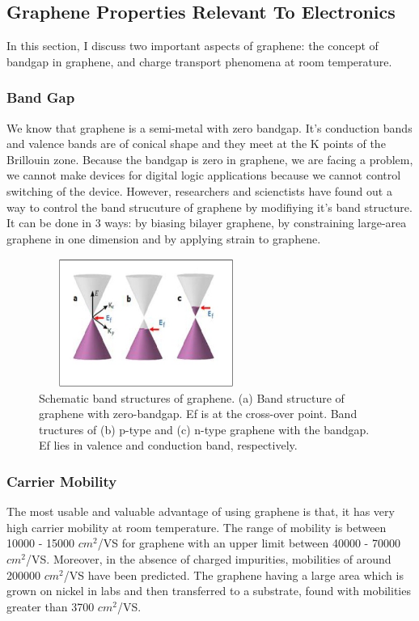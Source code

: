\documentclass[conference]{IEEEtran}
\begin{document}
\subsection{\textbf{Graphene Properties Relevant To Electronics}}
In this section, I discuss two important aspects of graphene: the concept of bandgap in graphene, and charge transport phenomena at room temperature.

\subsubsection{\textbf{Band Gap}}
We know that graphene is a semi-metal with zero bandgap. It's conduction bands and valence bands are of conical shape and they meet at the K points of the Brillouin zone. Because the bandgap is zero in graphene, we are facing a problem, we cannot make devices for digital logic applications because we cannot control switching of the device. However, researchers and scienctists have found out a way to control the band strucuture of graphene by modifiying it's band structure. It can be done in 3 ways: by biasing bilayer graphene, by constraining large-area graphene in one dimension and by applying strain to graphene.
\\
\begin{figure}[h]
\centering
\includegraphics[width=7cm, height=4.2cm]{1.jpg}
\caption{Schematic band structures of graphene. (a) Band structure of graphene with zero-bandgap. Ef is at the cross-over point. Band tructures of (b) p-type and (c) n-type graphene with the bandgap. Ef lies in valence and conduction band, respectively.}
\end{figure}

\subsubsection{\textbf{Carrier Mobility}}
The most usable and valuable advantage of using graphene is that, it has very high carrier mobility at room temperature. The range of mobility is between 10000 - 15000 $cm^2$/VS for graphene with an upper limit between 40000 - 70000 $cm^2$/VS. Moreover, in the absence of charged impurities, mobilities of around 200000 $cm^2$/VS have been predicted. The graphene having a large area which is grown on nickel in labs and then transferred to a substrate, found with mobilities greater than 3700 $cm^2$/VS.
\\
\end{document}

